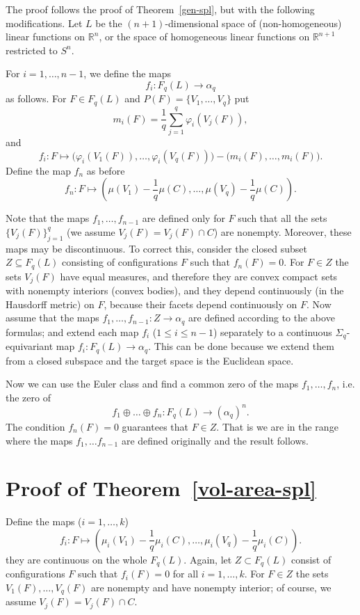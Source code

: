 \documentclass[12pt,a4paper,oneside]{amsart}
\theoremstyle{definition}
\theoremstyle{remark}
\numberwithin{equation}{section}
\renewcommand{\phi}{\varphi}
\newcommand{\Sg}{\Sigma}
\begin{document}
The proof follows the proof of Theorem~\ref{gen-spl}, but with the following modifications. Let $L$ be the $(n+1)$-dimensional space of (non-homogeneous) linear functions on $\mathbb R^n$, or the space of homogeneous linear functions on $\mathbb R^{n+1}$ restricted to $S^n$.

For $i=1, \ldots, n-1$, we define the maps 
$$
f_i : F_q(L) \to \alpha_q
$$
as follows. For $F\in F_q(L)$ and $P(F) = \{V_1,\ldots, V_q\}$ put 
$$
m_i(F) = \frac{1}{q} \sum_{j=1}^q \phi_i(V_j(F)),
$$
and
$$
f_i : F \mapsto \big(\phi_i(V_1(F)), \ldots, \phi_i(V_q(F))\big) - \big(m_i(F), \ldots, m_i(F)\big).
$$
Define the map $f_n$ as before
$$
f_n : F\mapsto \left(\mu(V_1) - \frac{1}{q}\mu(C), \ldots, \mu(V_q) - \frac{1}{q}\mu(C)\right).
$$

Note that the maps $f_1,\ldots, f_{n-1}$ are defined only for $F$ such that all the sets $\{V_j(F)\}_{j=1}^q$ (we assume $V_j(F) = V_j(F)\cap C$) are nonempty. Moreover, these maps may be discontinuous. To correct this, consider the closed subset $Z\subseteq F_q(L)$ consisting of configurations $F$ such that $f_n(F)=0$. For $F\in Z$ the sets $V_j(F)$ have equal measures, and therefore they are convex compact sets with nonempty interiors (convex bodies), and they depend continuously (in the Hausdorff metric) on $F$, because their facets depend continuously on $F$. Now assume that the maps $f_1, \ldots, f_{n-1} : Z\to \alpha_q$ are defined according to the above formulas; and extend each map $f_i$ ($1\le i \le n-1$)  separately to a continuous $\Sg_q$-equivariant map $f_i : F_q(L)\to \alpha_q$. This can be done because we extend them from a closed subspace and the target space is the Euclidean space.

Now we can use the Euler class and find a common zero of the maps $f_1, \ldots, f_n$, i.e. the zero of 
$$ 
f_1\oplus\dots\oplus f_n: F_q(L)\to (\alpha_q)^n.
$$ 
The condition $f_n(F)=0$ guarantees that $F\in Z$. That is we are in the range where the maps $f_1,\ldots f_{n-1}$ are defined originally and the result follows.

\section{Proof of Theorem~\ref{vol-area-spl}}

Define the maps ($i=1,\ldots, k$)
$$
f_i : F\mapsto \left(\mu_i(V_1) - \frac{1}{q}\mu_i(C), \ldots, \mu_i(V_q) - \frac{1}{q}\mu_i(C)\right).
$$
they are continuous on the whole $F_q(L)$. Again, let $Z\subset F_q(L)$ consist of configurations $F$ such that $f_i(F)=0$ for all $i=1,\ldots, k$. For $F\in Z$ the sets $V_1(F), \ldots, V_q(F)$ are nonempty and have nonempty interior; of course, we assume $V_j(F) = V_j(F)\cap C$.
\end{document}
